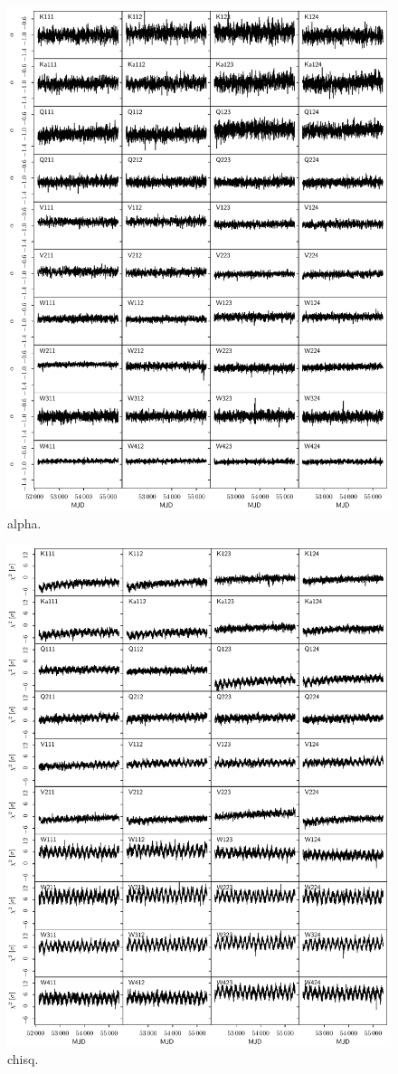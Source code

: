 \documentclass[twocolumn]{../../common/aa}
\begin{document}
\begin{figure}[p]
  	\centering
	\includegraphics[width=\textwidth]{figures/instpar_CG_alpha_v1.pdf}
	\caption{alpha.}
	\label{fig:alpha}
\end{figure}


\begin{figure}[p]
  	\centering
	\includegraphics[width=\textwidth]{figures/instpar_CG_chisq_v1.pdf}
	\caption{chisq.}
	\label{fig:chisq}
\end{figure}
\end{document}
